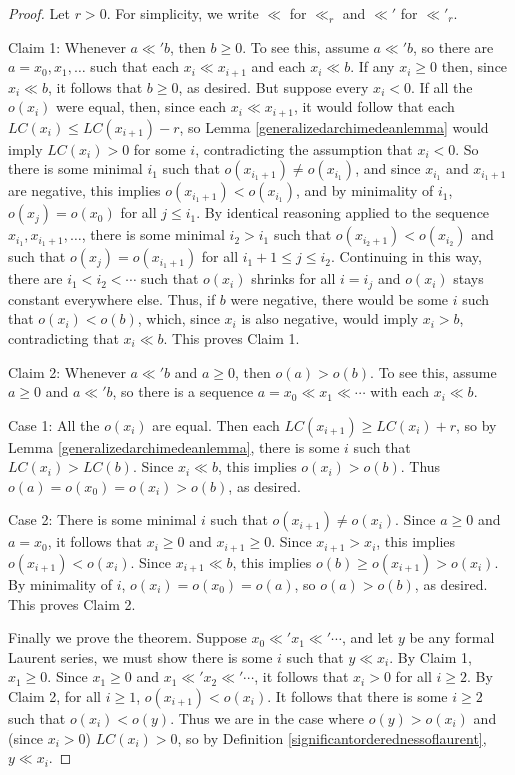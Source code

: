 \documentclass[twoside,11pt]{article}
\begin{document}
\begin{proof}
Let $r>0$. For simplicity, we write $\ll$ for $\ll_r$ and $\ll'$ for
$\ll'_r$.

Claim 1: Whenever $a\ll' b$, then $b\geq 0$.
To see this, assume $a\ll' b$, so there are $a=x_0,x_1,\ldots$ such that each
$x_i\ll x_{i+1}$ and each $x_i\ll b$.
If any $x_i\geq 0$ then, since $x_i\ll b$, it follows that $b\geq 0$, as desired.
But suppose every $x_i<0$.
If all the $o(x_i)$ were equal, then, since each
$x_i\ll x_{i+1}$, it would follow that each $LC(x_{i})\leq LC(x_{i+1})-r$, so Lemma
\ref{generalizedarchimedeanlemma} would imply $LC(x_i)>0$ for some $i$, contradicting
the assumption that $x_i<0$. So there is some minimal $i_1$ such
that $o(x_{i_1+1})\not=o(x_{i_1})$,
and since $x_{i_1}$ and $x_{i_1+1}$ are negative, this implies
$o(x_{i_1+1})<o(x_{i_1})$, and by minimality of $i_1$, $o(x_j)=o(x_0)$ for all
$j\leq i_1$.
By identical reasoning applied to the sequence $x_{i_1},x_{i_1+1},\ldots$,
there is some minimal $i_2>i_1$ such that $o(x_{i_2+1})<o(x_{i_2})$
and such that $o(x_j)=o(x_{i_1+1})$ for all $i_1+1\leq j\leq i_2$.
Continuing in this way, there are $i_1<i_2<\cdots$ such that $o(x_i)$ shrinks
for all $i=i_j$ and $o(x_i)$ stays constant everywhere else. Thus, if $b$ were negative,
there would be some $i$ such that $o(x_i)<o(b)$, which, since $x_i$ is also negative,
would imply $x_i>b$, contradicting that $x_i\ll b$. This proves Claim 1.

Claim 2: Whenever $a\ll' b$ and $a\geq 0$, then $o(a)>o(b)$.
To see this, assume $a\geq 0$ and $a\ll' b$, so there is a sequence
$a=x_0\ll x_1\ll\cdots$ with each $x_i\ll b$.

Case 1: All the $o(x_i)$ are equal. Then each $LC(x_{i+1})\geq LC(x_i)+r$, so by Lemma
\ref{generalizedarchimedeanlemma}, there is some $i$ such that $LC(x_i)>LC(b)$.
Since $x_i\ll b$, this implies $o(x_i)>o(b)$. Thus $o(a)=o(x_0)=o(x_i)>o(b)$, as desired.

Case 2: There is some minimal $i$ such that $o(x_{i+1})\not=o(x_{i})$.
Since $a\geq 0$ and $a=x_0$, it follows that $x_i\geq 0$ and $x_{i+1}\geq 0$. Since
$x_{i+1}>x_{i}$, this implies $o(x_{i+1})<o(x_{i})$.
Since $x_{i+1}\ll b$, this implies $o(b)\geq o(x_{i+1})>o(x_i)$.
By minimality of $i$, $o(x_i)=o(x_0)=o(a)$, so $o(a)>o(b)$, as desired. This proves Claim 2.

Finally we prove the theorem. Suppose $x_0\ll' x_1\ll' \cdots$, and let
$y$ be any formal Laurent series, we must show there is some $i$ such that
$y\ll x_i$. By Claim 1, $x_1\geq 0$.
Since $x_1\geq 0$ and $x_1\ll' x_2\ll'\cdots$, it follows that $x_i>0$ for all $i\geq 2$.
By Claim 2, for all $i\geq 1$, $o(x_{i+1})<o(x_i)$.
It follows that there is some $i\geq 2$
such that $o(x_i)<o(y)$.
Thus we are in the case where $o(y)>o(x_i)$ and (since $x_i> 0$) $LC(x_i)>0$,
so by Definition \ref{significantorderednessoflaurent}, $y\ll x_i$.
\end{proof}
\end{document}
